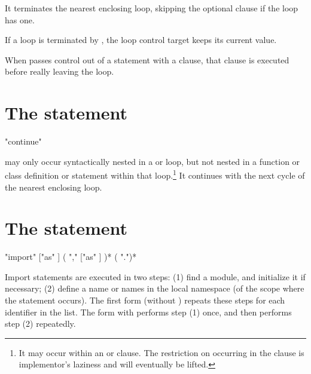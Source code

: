 It terminates the nearest enclosing loop, skipping the optional
 clause if the loop has one.

If a  loop is terminated by , the loop control
target keeps its current value.

When  passes control out of a  statement
with a  clause, that  clause is executed
before really leaving the loop.


\section{The  statement \label{continue}}

\begin{productionlist}
             {"continue"}
\end{productionlist}

 may only occur syntactically nested in a  or
 loop, but not nested in a function or class definition or
 statement within that loop.\footnote{It may
occur within an  or  clause.  The
restriction on occurring in the  clause is implementor's
laziness and will eventually be lifted.}
It continues with the next cycle of the nearest enclosing loop.


\section{The  statement \label{import}}

\begin{productionlist}
             {"import"  ["as" ]
                ( ","  ["as" ] )*}
             {( ".")* }
\end{productionlist}

Import statements are executed in two steps: (1) find a module, and
initialize it if necessary; (2) define a name or names in the local
namespace (of the scope where the  statement occurs).
The first form (without ) repeats these steps for each
identifier in the list.  The form with  performs step
(1) once, and then performs step (2) repeatedly.

